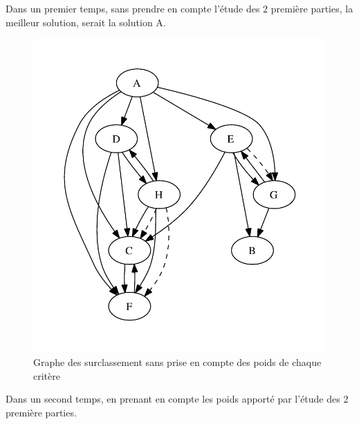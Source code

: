 Dans un premier temps, sans prendre en compte l'étude des 2 première parties, la meilleur solution, serait la solution A.

\begin{figure}
\includegraphics{../SourcesMatlab/electre3-1.pdf}
\caption{Graphe des surclassement sans prise en compte des poids de chaque critère}
\end{figure}

Dans un second temps, en prenant en compte les poids apporté par l'étude des 2 première parties.
